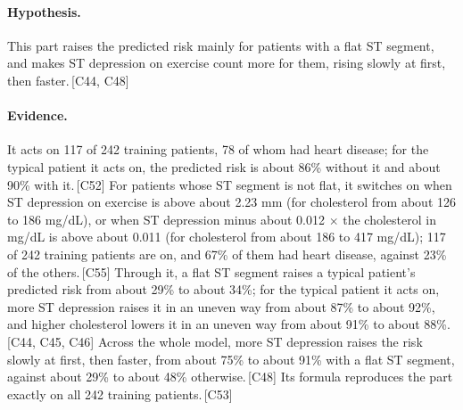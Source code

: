 \documentclass[a4paper,10pt]{article}
\newif\ifreviewmarks
\newcommand{\reviewrule}{\noindent{\color{BrickRed}\rule{\linewidth}{0.8pt}}}
\newenvironment{drafted}[1][]{%
  \ifreviewmarks\par\addvspace{\medskipamount}\reviewrule\par\nopagebreak
  \noindent{\color{BrickRed}\sffamily\footnotesize\textbf{Thesis Draft}\quad #1\hfill review}\par\nopagebreak\smallskip\fi}{%
  \ifreviewmarks\par\smallskip\noindent{\color{BrickRed}\sffamily\footnotesize end of thesis draft}\par\nopagebreak\reviewrule\par\medskip\fi}
\begin{document}
\begin{drafted}[plain-language layer: heart-s2-c1]
\paragraph{Hypothesis.} This part raises the predicted risk mainly for patients with a flat ST segment, and makes ST depression on exercise count more for them, rising slowly at first, then faster.\,{\scriptsize\textcolor{NavyBlue}{[C44, C48]}}
\paragraph{Evidence.} It acts on 117 of 242 training patients, 78 of whom had heart disease; for the typical patient it acts on, the predicted risk is about 86\% without it and about 90\% with it.\,{\scriptsize\textcolor{NavyBlue}{[C52]}} For patients whose ST segment is not flat, it switches on when ST depression on exercise is above about 2.23 mm (for cholesterol from about 126 to 186 mg/dL), or when ST depression minus about 0.012 $\times$ the cholesterol in mg/dL is above about 0.011 (for cholesterol from about 186 to 417 mg/dL); 117 of 242 training patients are on, and 67\% of them had heart disease, against 23\% of the others.\,{\scriptsize\textcolor{NavyBlue}{[C55]}} Through it, a flat ST segment raises a typical patient's predicted risk from about 29\% to about 34\%; for the typical patient it acts on, more ST depression raises it in an uneven way from about 87\% to about 92\%, and higher cholesterol lowers it in an uneven way from about 91\% to about 88\%.\,{\scriptsize\textcolor{NavyBlue}{[C44, C45, C46]}} Across the whole model, more ST depression raises the risk slowly at first, then faster, from about 75\% to about 91\% with a flat ST segment, against about 29\% to about 48\% otherwise.\,{\scriptsize\textcolor{NavyBlue}{[C48]}} Its formula reproduces the part exactly on all 242 training patients.\,{\scriptsize\textcolor{NavyBlue}{[C53]}}
\par{}

\end{drafted}
\end{document}
